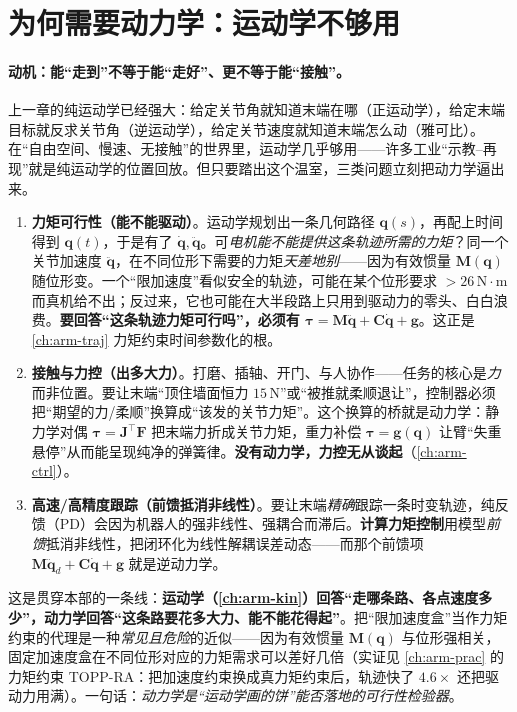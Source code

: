 \section{为何需要动力学：运动学不够用}
\label{sec:ad-why}

\paragraph{动机：能“走到”不等于能“走好”、更不等于能“接触”。}
上一章的纯运动学已经强大：给定关节角就知道末端在哪（正运动学），给定末端目标就反求关节角（逆运动学），给定关节速度就知道末端怎么动（雅可比）。在“自由空间、慢速、无接触”的世界里，运动学几乎够用——许多工业“示教--再现”就是纯运动学的位置回放。但只要踏出这个温室，三类问题立刻把动力学逼出来。

\begin{enumerate}
  \item \textbf{力矩可行性（能不能驱动）}。运动学规划出一条几何路径 $\mathbf{q}(s)$，再配上时间得到 $\mathbf{q}(t)$，于是有了 $\dot{\mathbf{q}},\ddot{\mathbf{q}}$。可\emph{电机能不能提供这条轨迹所需的力矩}？同一个关节加速度 $\ddot{\mathbf{q}}$，在不同位形下需要的力矩\emph{天差地别}——因为有效惯量 $\mathbf{M}(\mathbf{q})$ 随位形变。一个“限加速度”看似安全的轨迹，可能在某个位形要求 $>26\,\mathrm{N\!\cdot\! m}$ 而真机给不出；反过来，它也可能在大半段路上只用到驱动力的零头、白白浪费。\textbf{要回答“这条轨迹力矩可行吗”，必须有 $\boldsymbol{\tau}=\mathbf{M}\ddot{\mathbf{q}}+\mathbf{C}\dot{\mathbf{q}}+\mathbf{g}$}。这正是 \cref{ch:arm-traj} 力矩约束时间参数化的根。
  \item \textbf{接触与力控（出多大力）}。打磨、插轴、开门、与人协作——任务的核心是\emph{力}而非位置。要让末端“顶住墙面恒力 $15\,\mathrm{N}$”或“被推就柔顺退让”，控制器必须把“期望的力/柔顺”换算成“该发的关节力矩”。这个换算的桥就是动力学：静力学对偶 $\boldsymbol{\tau}=\mathbf{J}^\top\mathbf{F}$ 把末端力折成关节力矩，重力补偿 $\boldsymbol{\tau}=\mathbf{g}(\mathbf{q})$ 让臂“失重悬停”从而能呈现纯净的弹簧律。\textbf{没有动力学，力控无从谈起}（\cref{ch:arm-ctrl}）。
  \item \textbf{高速/高精度跟踪（前馈抵消非线性）}。要让末端\emph{精确}跟踪一条时变轨迹，纯反馈（PD）会因为机器人的强非线性、强耦合而滞后。\textbf{计算力矩控制}用模型\emph{前馈}抵消非线性，把闭环化为线性解耦误差动态——而那个前馈项 $\mathbf{M}\ddot{\mathbf{q}}_d+\mathbf{C}\dot{\mathbf{q}}+\mathbf{g}$ 就是逆动力学。
\end{enumerate}

\begin{insight}[运动学规划的轨迹未必是力矩可执行的]
\label{ins:ad-kin-not-enough}
这是贯穿本部的一条线：\textbf{运动学（\cref{ch:arm-kin}）回答“走哪条路、各点速度多少”，动力学回答“这条路要花多大力、能不能花得起”}。把“限加速度盒”当作力矩约束的代理是一种\emph{常见且危险}的近似——因为有效惯量 $\mathbf{M}(\mathbf{q})$ 与位形强相关，固定加速度盒在不同位形对应的力矩需求可以差好几倍（实证见 \cref{ch:arm-prac} 的力矩约束 TOPP-RA：把加速度约束换成真力矩约束后，轨迹快了 $4.6\times$ 还把驱动力用满）。一句话：\emph{动力学是“运动学画的饼”能否落地的可行性检验器}。
\end{insight}


